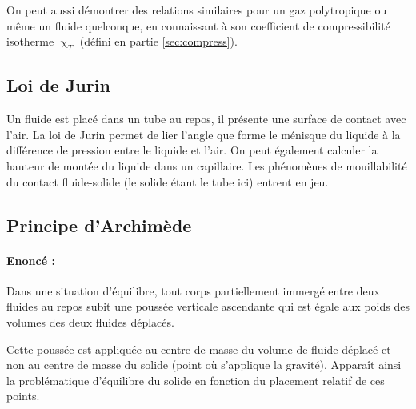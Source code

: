 On peut aussi démontrer des relations similaires pour un gaz polytropique ou même un fluide quelconque, en connaissant à son coefficient de compressibilité isotherme $\upchi_T$ (défini en partie \ref{sec:compress}).

\subsection{Loi de Jurin}
Un fluide est placé dans un tube au repos, il présente une surface de contact avec l'air. La loi de Jurin permet de lier l'angle que forme le ménisque du liquide à la différence de pression entre le liquide et l'air. On peut également calculer la hauteur de montée du liquide dans un capillaire. Les phénomènes de mouillabilité du contact fluide-solide (le solide étant le tube ici) entrent en jeu.

\subsection{Principe d'Archimède}
\paragraph{Enoncé :}Dans une situation d'équilibre, tout corps partiellement immergé entre deux fluides au repos subit une poussée verticale ascendante qui est égale aux poids des volumes des deux fluides déplacés.

Cette poussée est appliquée au centre de masse du volume de fluide déplacé et non au centre de masse du solide (point où s'applique la gravité). Apparaît ainsi la problématique d'équilibre du solide en fonction du placement relatif de ces points.
